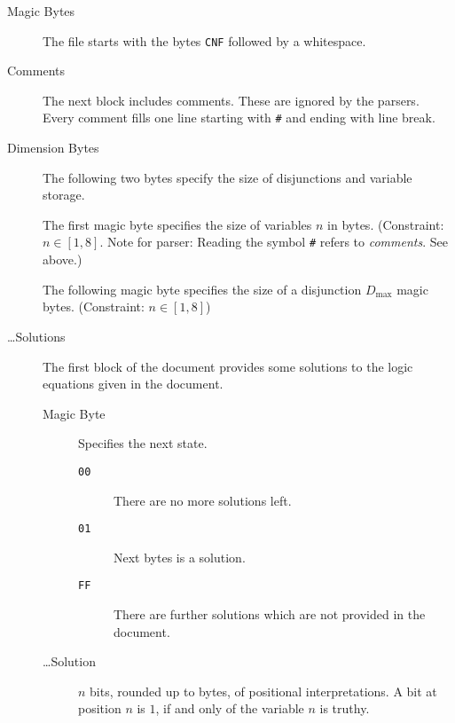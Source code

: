 \documentclass[12pt, letterpaper]{article}
\begin{document}
    \begin{description}
		\item[Magic Bytes]
		
		The file starts with the bytes \texttt{CNF}
		followed by a whitespace.

		\item[Comments]
		
		The next block includes comments. These are
		ignored by the parsers. Every comment fills
		one line starting with \texttt{\#} and ending
		with line break.

		\item[Dimension Bytes]
		
		The following two bytes specify the size of
		disjunctions and variable storage.

		The first magic byte specifies the size of
		variables $n$ in bytes. (Constraint: $n \in
		[1,8]$. Note for parser: Reading the symbol
		\texttt{\#} refers to \emph{comments}. See
		above.)

		The following magic byte specifies the size
		of a disjunction $D_\text{max}$ magic bytes.
		(Constraint: $n \in [1,8]$)

		\item[\ldots Solutions]
		
		The first block of the document provides some
		solutions to the logic equations given in the 
		document.

		\begin{description}
			\item[Magic Byte]
			
			Specifies the next state.

			\begin{description}
				\item[\texttt{00}]
				
				There are no more solutions
				left.

				\item[\texttt{01}]
				
				Next bytes is a solution.

				\item[\texttt{FF}]
				
				There are further solutions
				which are not provided in the 
				document.

			\end{description}

			\item[\ldots Solution]
			
			$n$ bits, rounded up to bytes, of
			positional interpretations. A bit
			at position $n$ is $1$, if and
			only of the variable $n$ is truthy.


\end{description}
\end{description}
\end{document}
